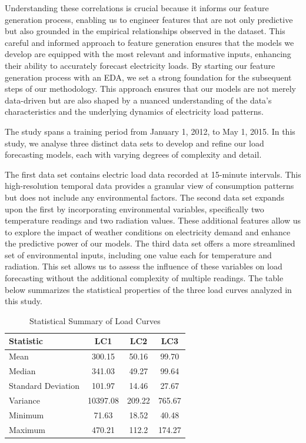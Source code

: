 \documentclass{article} %
\begin{document}
Understanding these correlations is crucial because it informs our feature generation process, enabling us to engineer features that are not only predictive but also grounded in the empirical relationships observed in the dataset. This careful and informed approach to feature generation ensures that the models we develop are equipped with the most relevant and informative inputs, enhancing their ability to accurately forecast electricity loads. By starting our feature generation process with an \gls{EDA}, we set a strong foundation for the subsequent steps of our methodology. This approach ensures that our models are not merely data-driven but are also shaped by a nuanced understanding of the data's characteristics and the underlying dynamics of electricity load patterns. 

The study spans a training period from January 1, 2012, to May 1, 2015. In this study, we analyse three distinct data sets to develop and refine our load forecasting models, each with varying degrees of complexity and detail. 

The first data set contains electric load data recorded at 15-minute intervals. This high-resolution temporal data provides a granular view of consumption patterns but does not include any environmental factors. The second data set expands upon the first by incorporating environmental variables, specifically two temperature readings and two radiation values. These additional features allow us to explore the impact of weather conditions on electricity demand and enhance the predictive power of our models. The third data set offers a more streamlined set of environmental inputs, including one value each for temperature and radiation. This set allows us to assess the influence of these variables on load forecasting without the additional complexity of multiple readings. 
The table below summarizes the statistical properties of the three load curves analyzed in this study.
\begin{table}[ht]
\centering
\caption{Statistical Summary of Load Curves}
\label{tab:lc_statistics}
\begin{tabular}{@{}lccc@{}}
\toprule
Statistic & LC1 & LC2 & LC3 \\ \midrule
Mean & 300.15 & 50.16 & 99.70 \\
Median & 341.03 & 49.27 & 99.64 \\
Standard Deviation & 101.97 & 14.46 & 27.67 \\
Variance & 10397.08 & 209.22 & 765.67 \\
Minimum & 71.63 & 18.52 & 40.48 \\
Maximum & 470.21 & 112.2 & 174.27 \\ \bottomrule
\end{tabular}
\end{table}
\end{document}
